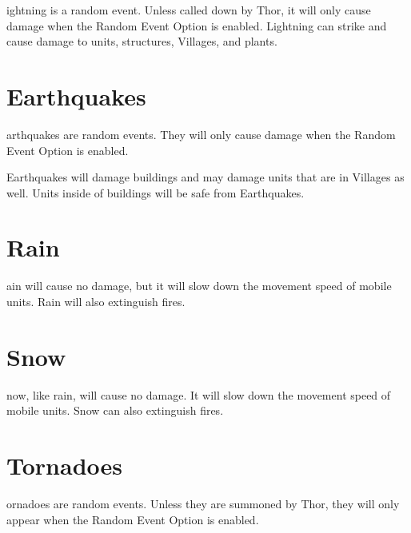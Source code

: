 
ightning is a random event. Unless called down by Thor, it will only cause damage when the Random Event Option is enabled. Lightning can strike and cause damage to units, structures, Villages, and plants.

\section{Earthquakes}


arthquakes are random events. They will only cause damage when the Random Event Option is enabled.

Earthquakes will damage buildings and may damage units that are in Villages as well. Units inside of buildings will be safe from Earthquakes.

\section{Rain}


ain will cause no damage, but it will slow down the movement speed of mobile units. Rain will also extinguish fires.

\section{Snow}


now, like rain, will cause no damage. It will slow down the movement speed of mobile units. Snow can also extinguish fires.

\section{Tornadoes}


ornadoes are random events. Unless they are summoned by Thor, they will only appear when the Random Event Option is enabled.